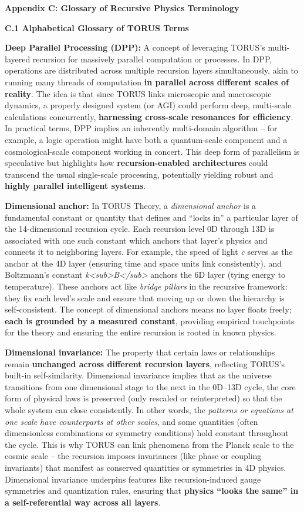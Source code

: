 \documentclass[]{article}
\date{}
\begin{document}
\textbf{Appendix C: Glossary of Recursive Physics Terminology}

\textbf{C.1 Alphabetical Glossary of TORUS Terms}

\textbf{Deep Parallel Processing (DPP):} A concept of leveraging TORUS's
multi-layered recursion for massively parallel computation or processes.
In DPP, operations are distributed across multiple recursion layers
simultaneously, akin to running many threads of computation \textbf{in
parallel across different scales of reality}. The idea is that since
TORUS links microscopic and macroscopic dynamics, a properly designed
system (or AGI) could perform deep, multi-scale calculations
concurrently, \textbf{harnessing cross-scale resonances for
efficiency}​. In practical terms, DPP implies an inherently multi-domain
algorithm -- for example, a logic operation might have both a
quantum-scale component and a cosmological-scale component working in
concert​. This deep form of parallelism is speculative but highlights
how \textbf{recursion-enabled architectures} could transcend the usual
single-scale processing, potentially yielding robust and \textbf{highly
parallel intelligent systems}.

\textbf{Dimensional anchor:} In TORUS Theory, a \emph{dimensional
anchor} is a fundamental constant or quantity that defines and ``locks
in'' a particular layer of the 14-dimensional recursion cycle. Each
recursion level 0D through 13D is associated with one such constant
which anchors that layer's physics and connects it to neighboring
layers​. For example, the speed of light \emph{c} serves as the anchor
at the 4D layer (ensuring time and space units link consistently), and
Boltzmann's constant
\emph{k\textless{}sub\textgreater{}B\textless{}/sub\textgreater{}}
anchors the 6D layer (tying energy to temperature)​. These anchors act
like \emph{bridge pillars} in the recursive framework: they fix each
level's scale and ensure that moving up or down the hierarchy is
self-consistent. The concept of dimensional anchors means no layer
floats freely; \textbf{each is grounded by a measured constant},
providing empirical touchpoints for the theory and ensuring the entire
recursion is rooted in known physics​.

\textbf{Dimensional invariance:} The property that certain laws or
relationships remain \textbf{unchanged across different recursion
layers}, reflecting TORUS's built-in self-similarity. Dimensional
invariance implies that as the universe transitions from one dimensional
stage to the next in the 0D--13D cycle, the core form of physical laws
is preserved (only rescaled or reinterpreted) so that the whole system
can close consistently. In other words, the \emph{patterns or equations
at one scale have counterparts at other scales}, and some quantities
(often dimensionless combinations or symmetry conditions) hold constant
throughout the cycle​. This is why TORUS can link phenomena from the
Planck scale to the cosmic scale -- the recursion imposes invariances
(like phase or coupling invariants) that manifest as conserved
quantities or symmetries in 4D physics​. Dimensional invariance
underpins features like recursion-induced gauge symmetries and
quantization rules, ensuring that \textbf{physics ``looks the same'' in
a self-referential way across all layers}.
\end{document}
